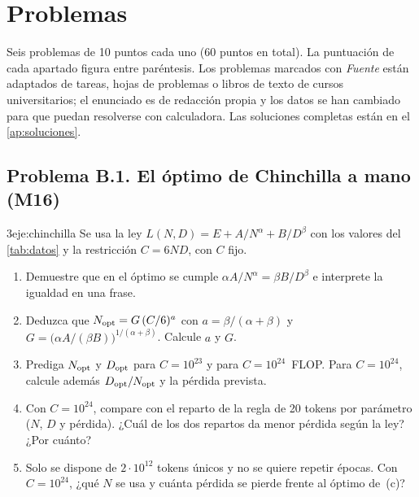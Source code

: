 \chapter{Problemas}
\label{cap:problemas}

Seis problemas de 10 puntos cada uno (60 puntos en total). La puntuación de cada apartado figura entre paréntesis. Los problemas marcados con \emph{Fuente} están adaptados de tareas, hojas de problemas o libros de texto de cursos universitarios; el enunciado es de redacción propia y los datos se han cambiado para que puedan resolverse con calculadora. Las soluciones completas están en el \cref{ap:soluciones}.

\section*{Problema B.1. El óptimo de Chinchilla a mano (M16)}

\begin{ejercicio}{3}{eje:chinchilla}
Se usa la ley $L(N,D)=E+A/N^{\alpha}+B/D^{\beta}$ con los valores del \cref{tab:datos} y la restricción $C=6ND$, con $C$ fijo.
\begin{enumerate}[label=(\alph*)]
  \item {} Demuestre que en el óptimo se cumple $\alpha A/N^{\alpha}=\beta B/D^{\beta}$ e interprete la igualdad en una frase.
  \item {} Deduzca que $N_{\mathrm{opt}}=G\,(C/6)^{a}$ con $a=\beta/(\alpha+\beta)$ y $G=\bigl(\alpha A/(\beta B)\bigr)^{1/(\alpha+\beta)}$. Calcule $a$ y $G$.
  \item {} Prediga $N_{\mathrm{opt}}$ y $D_{\mathrm{opt}}$ para $C=10^{23}$ y para $C=10^{24}$~FLOP. Para $C=10^{24}$, calcule además $D_{\mathrm{opt}}/N_{\mathrm{opt}}$ y la pérdida prevista.
  \item {} Con $C=10^{24}$, compare con el reparto de la regla de 20 tokens por parámetro ($N$, $D$ y pérdida). ¿Cuál de los dos repartos da menor pérdida según la ley? ¿Por cuánto?
  \item {} Solo se dispone de $2\cdot 10^{12}$ tokens únicos y no se quiere repetir épocas. Con $C=10^{24}$, ¿qué $N$ se usa y cuánta pérdida se pierde frente al óptimo de~(c)?
\end{enumerate}
\end{ejercicio}

